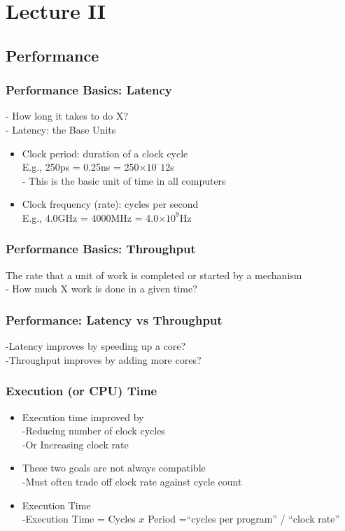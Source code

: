 \documentclass[12pt]{article}
\begin{document}
    \section{Lecture II}
    
    \subsection{Performance}
        \subsubsection{Performance Basics: Latency}
        - How long it takes to do X?\\
        - Latency: the Base Units\\
        \begin{itemize}
            \item {Clock period: duration of a clock cycle}\\
            E.g., 250ps = 0.25ns = 250×${10^–12}$s\\
            - This is the basic unit of time in all computers
            \item {Clock frequency (rate): cycles per second}\\
            E.g., 4.0GHz = 4000MHz = 4.0×$10^9$Hz
        \end{itemize}
        \subsubsection{Performance Basics: Throughput}
        The rate that a unit of work is completed or started by a mechanism\\
        - How much X work is done in a given time?
        \subsubsection{Performance: Latency vs Throughput}
        -Latency improves by speeding up a core?\\
        -Throughput improves by adding more cores?
        \subsubsection{Execution (or CPU) Time}
        \begin{itemize}
            \item {Execution time improved by}\\
            -Reducing number of clock cycles\\
            -Or Increasing clock rate
            \item {These two goals are not always compatible}\\
            -Must often trade off clock rate against cycle count
            \item {Execution Time}\\
            -Execution Time = Cycles $x$ Period =“cycles per program” / “clock rate”
        \end{itemize}
\end{document}
